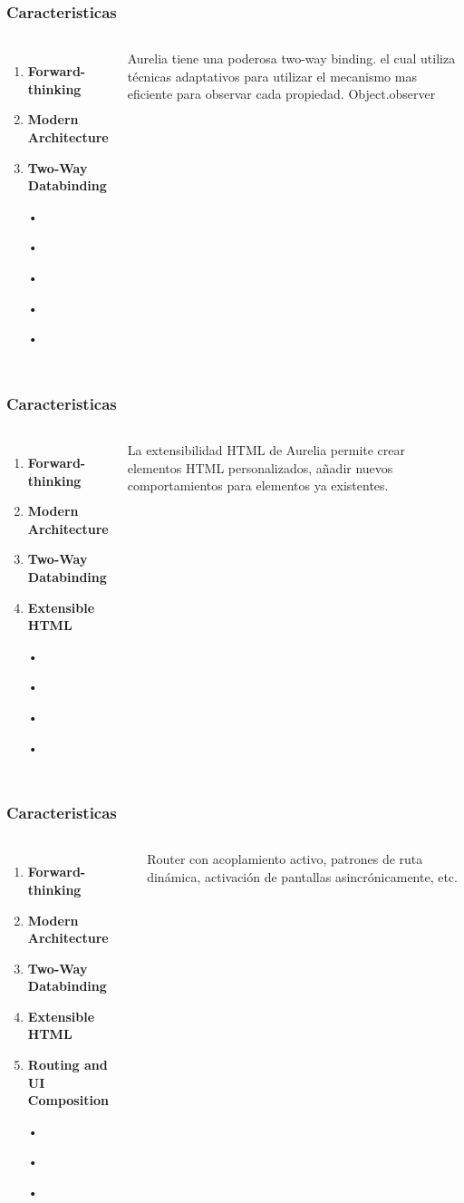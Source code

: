 \documentclass{beamer}
\begin{document}
\begin{frame}
\frametitle{Caracteristicas}
\begin{columns}[c]
\begin{enumerate}
\item \textbf{Forward-thinking}
\item \textbf{Modern Architecture}
\item \textbf{Two-Way Databinding}
\item[•]
\item[•]
\item[•]
\item[•]
\item[•]
\end{enumerate}
Aurelia tiene una poderosa two-way binding. el cual utiliza t\'ecnicas adaptativos para utilizar el mecanismo mas eficiente para observar cada propiedad. Object.observer
\end{columns}
\end{frame}
\begin{frame}
\frametitle{Caracteristicas}
\begin{columns}[c]
\begin{enumerate}
\item \textbf{Forward-thinking}
\item \textbf{Modern Architecture}
\item \textbf{Two-Way Databinding}
\item \textbf{Extensible HTML}
\item[•]
\item[•]
\item[•]
\item[•]
\end{enumerate}
La extensibilidad HTML de Aurelia permite crear elementos HTML personalizados, a\~nadir nuevos comportamientos para elementos ya existentes.
\end{columns}
\end{frame}
\begin{frame}
\frametitle{Caracteristicas}
\begin{columns}[c]
\begin{enumerate}
\item \textbf{Forward-thinking}
\item \textbf{Modern Architecture}
\item \textbf{Two-Way Databinding}
\item \textbf{Extensible HTML}
\item \textbf{Routing and UI Composition}
\item[•]
\item[•]
\item[•]
\end{enumerate}
Router con acoplamiento activo, patrones de ruta din\'amica, activaci\'on de pantallas asincr\'onicamente, etc.
\end{columns}
\end{frame}
\end{document}
